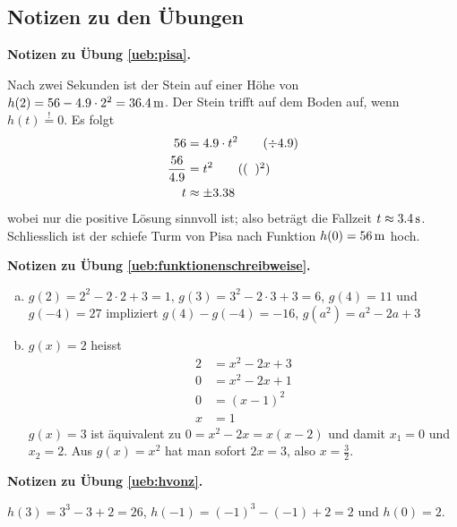 \documentclass[%
11pt,%
twoside,%
titlepage,%
german,%
headsepline%
]{scrartcl}
\newcommand{\concatueb}[1]{ueb:#1}%
\newcommand{\concatlsg}[1]{lsg:#1}%
\newenvironment{lsg}[1]{%
    \par\noindent\textbf{Notizen zu Übung \ref{\concatueb{#1}}.}%
    \label{\concatlsg{#1}}
}{%
    \par%
}
\begin{document}
\clearpage

\subsection{Notizen zu den Übungen}

\begin{lsg}{pisa}
	Nach zwei Sekunden ist der Stein auf einer H\"ohe von $h(2)=56-4.9\cdot2^{2}=\unit[36.4]{m}$. Der Stein trifft auf dem Boden auf, wenn $h(t)\stackrel{!}{=}0$. Es folgt
	\begin{align*}
		56&=4.9\cdot t^{2}\tag{$\div4.9$}\\
		\frac{56}{4.9} &= t^{2}\tag{$(\phantom{x})^{2}$}\\
		t &\approx \pm3.38
	\end{align*}
	wobei nur die positive L\"osung sinnvoll ist; also betr\"agt die Fallzeit $t\approx\unit[3.4]{s}$. Schliesslich ist der schiefe Turm von Pisa nach Funktion $h(0)=\unit[56]{m}$ hoch.
\end{lsg}
\begin{lsg}{funktionenschreibweise}
	\begin{enumerate}[a)]
		\item $g(2)=2^{2}-2\cdot2+3=1$, $g(3)=3^{2}-2\cdot3+3=6$, $g(4)=11$ und $g(-4)=27$ impliziert $g(4)-g(-4)=-16$, $g(a^{2})=a^{2}-2a+3$
		\item $g(x)=2$ heisst
		\begin{align*}
			2 &= x^{2}-2x+3\tag{$-2$}\\
			0 &= x^{2}-2x+1\\
			0 &= (x-1)^{2}\\
			x &= 1
		\end{align*}
		$g(x)=3$ ist \"aquivalent zu $0=x^{2}-2x=x(x-2)$ und damit $x_1=0$ und $x_{2}=2$. Aus  $g(x)=x^{2}$ hat man sofort $2x=3$, also $x=\frac{3}{2}$.
	\end{enumerate}
\end{lsg}
\begin{lsg}{hvonz}
	$h(3)=3^{3}-3+2=26$, $h(-1)=(-1)^{3}-(-1)+2=2$ und $h(0)=2$.
\end{lsg}
\end{document}
